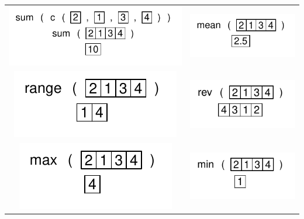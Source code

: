 \documentclass[pdflatex]{article}
\begin{document}
\begin{tabular}{cc}
\includegraphics{sum} & \includegraphics{mean}\\
\includegraphics{range} & \includegraphics{rev}\\
\includegraphics{max} & \includegraphics{min}\\
\end{tabular}

\end{document}
